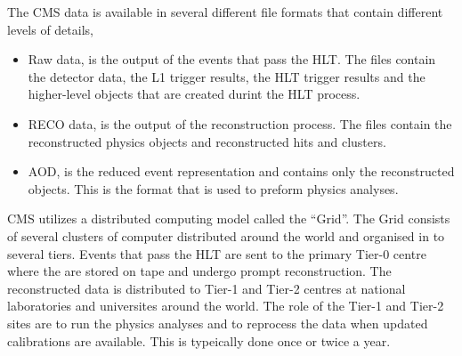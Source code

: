 The {CMS} data is available in several different file formats that contain
different levels of details,
\begin{itemize}
\item Raw data, is the output of the events that pass the {HLT}. The files
contain the detector data, the {L1} trigger results, the {HLT} trigger
results and the higher-level objects that are created durint the {HLT}
process.
\item {RECO} data, is the output of the reconstruction process. The files contain
the reconstructed physics objects and reconstructed hits and clusters.
\item {AOD}, is the reduced event representation and contains only the
reconstructed objects. This is the format that is used to preform physics
analyses.
\end{itemize}

CMS utilizes a distributed computing model called the ``Grid''.
The Grid consists of several clusters of computer distributed around the world
and organised in to several tiers.
Events that pass the {HLT} are sent to the primary Tier-0 centre where the
are stored on tape and undergo prompt reconstruction. The reconstructed data is
distributed to Tier-1 and Tier-2 centres at national laboratories and
universites around the world. The role of the Tier-1 and Tier-2 sites are to run
the physics analyses and to reprocess the data when updated calibrations are
available. This is typeically done once or twice a year.

